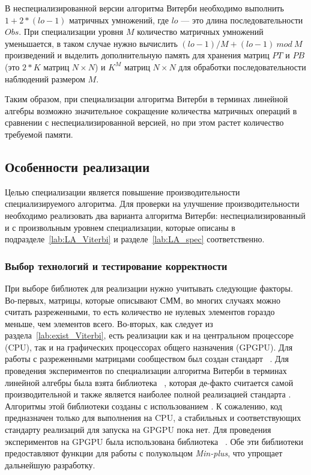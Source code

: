 В неспециализированной версии алгоритма Витерби необходимо 
выполнить $1 + 2 * (lo - 1)$ матричных умножений, где $lo$ 
--- это длина последовательности $Obs$.
При специализации уровня $M$ количество 
матричных умножений уменьшается, в таком случае нужно 
вычислить $\mathit{(lo - 1) / M + (lo - 1)\ mod\ M}$ 
произведений и выделить дополнительную память для хранения 
матриц $PT$ и $PB$ (это $2 * K$ матриц $N \times N$) и $K^{M}$ матриц $N 
\times N$ для обработки последовательности наблюдений 
размером $M$.

Таким образом, при специализации алгоритма Витерби в 
терминах линейной алгебры возможно значительное сокращение 
количества матричных операций в сравнении с 
неспециализированной версией, но при этом растет количество 
требуемой памяти.

\subsection{Особенности реализации}
Целью специализации является повышение производительности 
специализируемого алгоритма.
Для проверки на улучшение производительности необходимо 
реализовать два варианта алгоритма Витерби: 
неспециализированный и с произвольным уровнем специализации, 
которые описаны в подразделе~\ref{lab:LA_Viterbi} 
и разделе~\ref{lab:LA_spec} соответственно.

\subsubsection{Выбор технологий и тестирование корректности}
При выборе библиотек для реализации нужно учитывать следующие 
факторы.
Во-первых, матрицы, которые описывают СММ, во многих случаях 
можно считать разреженными, то есть количество не нулевых 
элементов гораздо меньше, чем элементов всего.
Во-вторых, как следует из раздела~\ref{lab:exist_Viterbi}, 
есть реализации как и на центральном процессоре (CPU), так и 
на графических процессорах общего назначения (GPGPU).
Для работы с разреженными матрицами сообществом был создан 
стандарт ~\cite{GraphBLAS}.
Для проведения экспериментов по специализации алгоритма 
Витерби в терминах линейной алгебры была взята библиотека 
~\cite{SuiteSparse}, 
которая де-факто считается самой производительной и также 
является наиболее полной реализацией стандарта 
.
Алгоритмы этой библиотеки созданы с использованием .
К сожалению, код  
предназначен только для выполнения на CPU, а стабильных и 
соответствующих стандарту  реализаций для 
запуска на GPGPU пока нет.
Для проведения экспериментов на GPGPU была использована 
библиотека ~\cite{CUSP}.
Обе эти библиотеки предоставляют функции для работы с 
полукольцом \emph{Min-plus}, что упрощает дальнейшую 
разработку.


